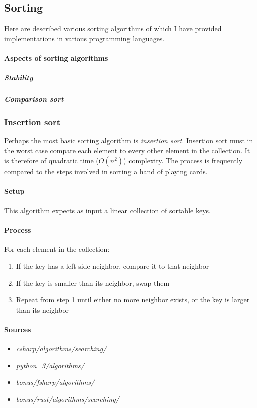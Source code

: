 \documentclass{article}
\begin{document}
\subsection{Sorting}
Here are described various sorting algorithms of which I have provided implementations in various programming
languages.

\paragraph{Aspects of sorting algorithms}
\subparagraph{Stability}
\subparagraph{Comparison sort}

\subsubsection{Insertion sort}
Perhaps the most basic sorting algorithm is {\em insertion sort}. Insertion sort must in the worst case compare
each element to every other element in the collection. It is therefore of quadratic time (\(O(n^2)\)) complexity.
The process is frequently compared to the steps involved in sorting a hand of playing cards.

\paragraph{Setup}
This algorithm expects as input a linear collection of sortable keys.

\paragraph{Process}
For each element in the collection:
\begin{enumerate}
\item{If the key has a left-side neighbor, compare it to that neighbor}
\item{If the key is smaller than its neighbor, swap them}
\item{Repeat from step 1 until either no more neighbor exists, or the key is larger than its neighbor}
\end{enumerate}

\begin{samepage}
  \paragraph{Sources}
  \begin{itemize}
  \item{{\em csharp/algorithms/searching/}}
  \item{{\em python\_3/algorithms/}}
  \item{{\em bonus/fsharp/algorithms/}}
  \item{{\em bonus/rust/algorithms/searching/}}
  \end{itemize}
\end{samepage}
\end{document}
